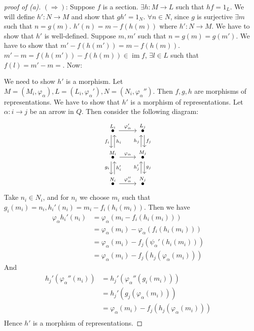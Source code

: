 \documentclass[11pt, a4paper]{report}
\begin{document}
\begin{proof}[proof of (a)] 
$ (\Rightarrow )$: Suppose $ f $ is a section. $ \exists h: M\to L $ such that $ hf=1_L $. We will define $ h': N\to M $ and show that $ gh'=1_N $. $ \forall n \in N $, since $ g $ is surjective $ \exists m $ such that $ n =g(m) $. $ h'(n)= m - f(h(m)) $ where $ h': N\to M $. We have to show that $ h' $ is well-defined. Suppose $ m,m' $ such that $ n=g(m)=g(m') $. We have to show that $ m'-f(h(m'))=m-f(h(m)) $. $ m'-m  =f(h(m'))-f(h(m)) \in \operatorname{im}f$, $ \exists l \in L $ such that $ f(l)=m'-m= $. Now: 

We need to show $ h' $ is a morphism. Let $ M=(M_i,\varphi_\alpha), L=(L_i,\varphi_\alpha'), N=(N_i, \varphi_\alpha'') $. Then $ f,g,h $ are morphisms of representations. We have to show that $ h' $ is a morphism of representations. Let $ \alpha: i \to j $ be an arrow in $ Q $. Then consider the following diagram:
\[
    \begin{tikzcd}
        \overset{L_i}{\bullet} \arrow[d, "f_i"', shift right] \arrow[r, "\varphi_{\alpha}'"]                               & \overset{L_j}{\bullet} \arrow[d, "f_j", shift left]                              \\
        \overset{M_i}{\bullet} \arrow[d, "g_i"', shift right] \arrow[r, "\varphi_{\alpha}"] \arrow[u, "h_i"', shift right] & \overset{M_j}{\bullet} \arrow[d, "g_j", shift left] \arrow[u, "h_j", shift left] \\
        \overset{N_i}{\bullet} \arrow[r, "\varphi_{\alpha}''"] \arrow[u, "h_i'"', shift right]                             & \overset{N_j}{\bullet} \arrow[u, "h_j'", shift left]                           
        \end{tikzcd}
\]
Take $ n_i \in N_i $, and for $ n_i $ we choose $ m_i $ such that $g_i(m_i)=n_i, h_i'(n_i)=m_i-f_i(h_i(m_i)) $. Then we have
\begin{align*}
\varphi_\alpha h_i' (n_i)&=\varphi_\alpha (m_i-f_i(h_i(m_i)))\\
&=\varphi_\alpha (m_i)-\varphi_\alpha (f_i(h_i(m_i)))\\
&=\varphi_\alpha (m_i)-f_j(\psi_\alpha' (h_i(m_i)))\\
&=\varphi_\alpha (m_i)-f_j(h_j(\varphi_\alpha(m_i)))
\end{align*}
And 
\begin{align*}
h_j'(\varphi_\alpha''(n_i))&=h_j'(\varphi_\alpha''(g_i(m_i)))\\
&=h_j'(g_j(\varphi_\alpha(m_i)))\\
&=\varphi_\alpha(m_i)-f_j(h_j(\varphi_\alpha(m_i)))\\
\end{align*}
Hence $ h' $ is a morphism of representations.


\end{proof}
\end{document}
